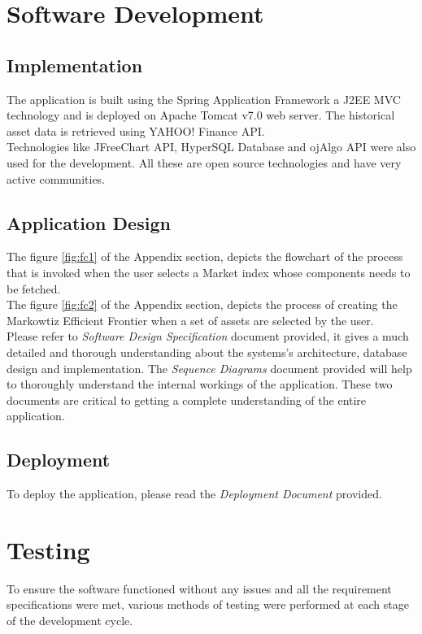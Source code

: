 \section{Software Development}
\subsection{Implementation}
The application is built using the Spring Application Framework a J2EE MVC technology and is deployed on Apache Tomcat v7.0 web server. The historical asset data is retrieved using YAHOO! Finance API.\\
Technologies like JFreeChart API, HyperSQL Database and ojAlgo API were also used for the development. All these are open source technologies and have very active communities.\\

\subsection{Application Design}
The figure \ref{fig:fc1} of the Appendix section, depicts the flowchart of the process that is invoked when the user selects a Market index whose components needs to be fetched.\\
The figure \ref{fig:fc2} of the Appendix section, depicts the process of creating the Markowtiz Efficient Frontier when a set of assets are selected by the user.\\
Please refer to \textit{Software Design Specification} document provided, it gives a much detailed and thorough understanding about the systems's architecture, database design and implementation. The \textit{Sequence Diagrams} document provided will help to thoroughly understand the internal workings of the application. These two documents are critical to getting a complete understanding of the entire application.

\subsection{Deployment}
To deploy the application, please read the \textit{Deployment Document} provided.\\

\section{Testing}
To ensure the software functioned without any issues and all the requirement specifications were met, various methods of testing were performed at each stage of the development cycle.

